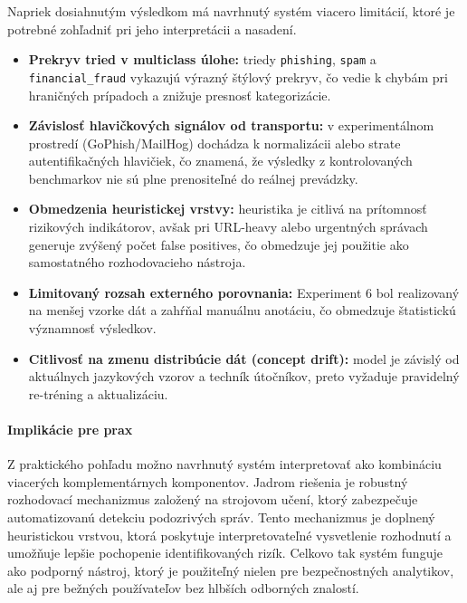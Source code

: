\documentclass[conference]{IEEEtran}
\begin{document}
Napriek dosiahnutým výsledkom má navrhnutý systém viacero limitácií,
ktoré je potrebné zohľadniť pri jeho interpretácii a nasadení.

\begin{itemize}
    \item \textbf{Prekryv tried v multiclass úlohe:}
    triedy \texttt{phishing}, \texttt{spam} a \texttt{financial\_fraud}
    vykazujú výrazný štýlový prekryv,
    čo vedie k chybám pri hraničných prípadoch a znižuje presnosť kategorizácie.

    \item \textbf{Závislosť hlavičkových signálov od transportu:}
    v experimentálnom prostredí (GoPhish/MailHog) dochádza k normalizácii
    alebo strate autentifikačných hlavičiek,
    čo znamená, že výsledky z kontrolovaných benchmarkov nie sú
    plne prenositeľné do reálnej prevádzky.

    \item \textbf{Obmedzenia heuristickej vrstvy:}
    heuristika je citlivá na prítomnosť rizikových indikátorov,
    avšak pri URL-heavy alebo urgentných správach generuje zvýšený počet
    false positives, čo obmedzuje jej použitie ako samostatného rozhodovacieho nástroja.

    \item \textbf{Limitovaný rozsah externého porovnania:}
    Experiment 6 bol realizovaný na menšej vzorke dát
    a zahŕňal manuálnu anotáciu,
    čo obmedzuje štatistickú významnosť výsledkov.

    \item \textbf{Citlivosť na zmenu distribúcie dát (concept drift):}
    model je závislý od aktuálnych jazykových vzorov a techník útočníkov,
    preto vyžaduje pravidelný re-tréning a aktualizáciu.

\end{itemize}

\paragraph{Implikácie pre prax}

Z praktického pohľadu možno navrhnutý systém interpretovať ako
kombináciu viacerých komplementárnych komponentov. Jadrom riešenia
je robustný rozhodovací mechanizmus založený na strojovom učení,
ktorý zabezpečuje automatizovanú detekciu podozrivých správ.
Tento mechanizmus je doplnený heuristickou vrstvou, ktorá poskytuje
interpretovateľné vysvetlenie rozhodnutí a umožňuje lepšie pochopenie
identifikovaných rizík. Celkovo tak systém funguje ako podporný nástroj,
ktorý je použiteľný nielen pre bezpečnostných analytikov, ale aj pre
bežných používateľov bez hlbších odborných znalostí.
\end{document}
